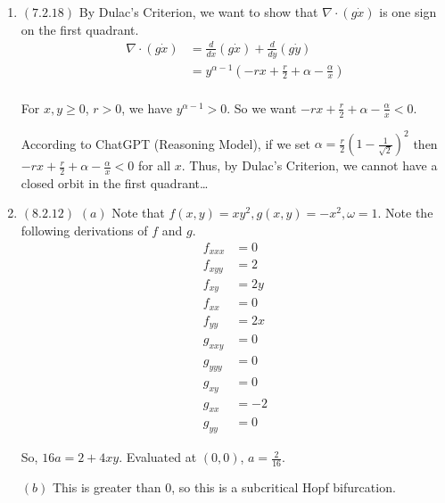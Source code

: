\documentclass[12pt]{article}
\begin{document}
\begin{enumerate}[start=1,label={\bfseries Problem \arabic*:},leftmargin=1in]
     \item $(7.2.18)$ By Dulac's Criterion, we want to show that $\nabla \cdot (g\dot{x})$ is one sign on the first quadrant.  
     \begin{align*}
        \nabla \cdot (g\dot{x}) &=  \frac{d}{dx} (g\dot{x}) + \frac{d}{dy}(g\dot{y}) \\ 
        &= y^{\alpha - 1} (-rx + \frac{r}{2} + \alpha - \frac{\alpha}{x})\\ 
     \end{align*}

     For $x, y \geq 0$, $r > 0$, we have $y^{\alpha-1} > 0$. 
     So we want $-rx + \frac{r}{2} + \alpha - \frac{\alpha}{x} < 0$. 

     According to ChatGPT (Reasoning Model), if we set $\alpha = \frac{r}{2}(1 - \frac{1}{\sqrt{2}})^2$ then $-rx + \frac{r}{2} + \alpha - \frac{\alpha}{x} < 0$ for all $x$. 
     Thus, by Dulac's Criterion, we cannot have a closed orbit in the first quadrant\dots
     
     \item $(8.2.12)$ 
     $(a)$
     Note that $f(x, y) = xy^2, g(x, y) = -x^2, \omega = 1$. Note the following derivations of $f$ and $g$.   
     \begin{align*}
        f_{xxx} &= 0\\
        f_{xyy} &= 2\\ 
        f_{xy} &= 2y\\ 
        f_{xx} &= 0\\ 
        f_{yy} &= 2x\\ 
        g_{xxy} &= 0\\ 
        g_{yyy} &= 0\\ 
        g_{xy} &= 0 \\
        g_{xx} &= -2\\
        g_{yy} &= 0
      \end{align*}

      So, $16a = 2 + 4xy$. Evaluated at $(0, 0)$, $a = \frac{2}{16}$. 
      
    $(b)$ This is greater than 0, so this is a subcritical Hopf bifurcation.
    \end{enumerate}
\end{document}
